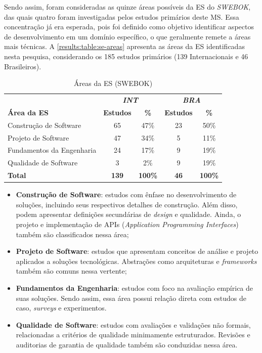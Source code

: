 Sendo assim, foram consideradas as quinze áreas possíveis da ES do \textit{SWEBOK}, das quais quatro foram investigadas pelos estudos primários deste MS. Essa concentração já era esperada, pois foi definido como objetivo identificar aspectos de desenvolvimento em um domínio específico, o que geralmente remete a áreas mais técnicas. A \autoref{results:table:se-areas} apresenta as áreas da ES identificadas nesta pesquisa, considerando os 185 estudos primários (139 Internacionais e 46 Brasileiros).

\begin{table}[htbp]
\caption{Áreas da ES (SWEBOK)}
\label{results:table:se-areas}
\centering
\begin{tabular}{lcccc}
\hline
                          & \multicolumn{2}{c}{\textbf{\textit{INT}}} & \multicolumn{2}{c}{\textbf{\textit{BRA}}} \\ \cline{2-5} 
\textbf{Área da ES}       & \textbf{Estudos} & \textbf{\%}             & \textbf{Estudos} & \textbf{\%}             \\ \hline
Construção de Software    & 65               & 47\%                    & 23               & 50\%                    \\ 
Projeto de Software       & 47               & 34\%                    & 5                & 11\%                    \\ 
Fundamentos da Engenharia & 24               & 17\%                    & 9                & 19\%                    \\ 
Qualidade de Software     & 3                & 2\%                     & 9                & 19\%                    \\ 
\textbf{Total}            & \textbf{139}     & \textbf{100\%} & \textbf{46}      & \textbf{100\%} \\ \hline
\end{tabular}
\fautor
\end{table}

\begin{itemize}
    \item \textbf{Construção de Software}: estudos com ênfase no desenvolvimento de soluções, incluindo seus respectivos detalhes de construção. Além disso, podem apresentar definições secundárias de \textit{design} e qualidade. Ainda, o projeto e implementação de APIs (\textit{Application Programming Interfaces}) também são classificados nessa área;
    \item \textbf{Projeto de Software}: estudos que apresentam conceitos de análise e projeto aplicados a soluções tecnológicas. Abstrações como arquiteturas e \textit{frameworks} também são comuns nessa vertente;
    \item \textbf{Fundamentos da Engenharia}: estudos com foco na avaliação empírica de suas soluções. Sendo assim, essa área possui relação direta com estudos de caso, \textit{surveys} e experimentos.
    \item \textbf{Qualidade de Software}: estudos com avaliações e validações não formais, relacionadas a critérios de qualidade minimamente estruturados. Revisões e auditorias de garantia de qualidade também são conduzidas nessa área.
\end{itemize}

